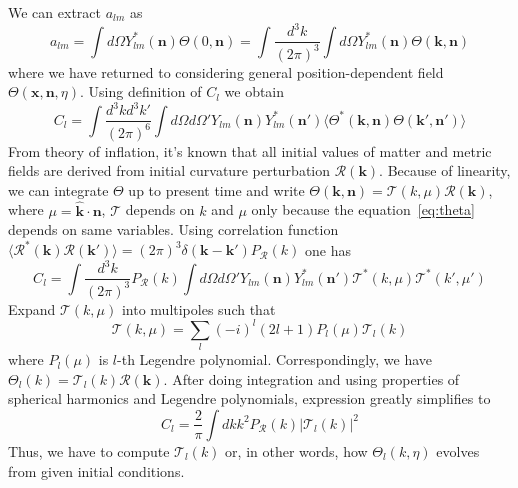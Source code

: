 \documentclass[12pt]{extarticle}
\numberwithin{problem}{section}
\numberwithin{theorem}{section}
\begin{document}
	We can extract $a_{lm}$ as 
	\begin{equation}
		a_{lm} = \int d\Omega Y_{lm}^*(\mathbf{n})\Theta(0, \mathbf{n}) = \int\frac{d^3k}{(2\pi)^3}\int d\Omega Y_{lm}^*(\mathbf{n})\Theta(\mathbf{k},\mathbf{n})
	\end{equation}
	where we have returned to considering general position-dependent field $\Theta(\mathbf{x}, \mathbf{n}, \eta)$. Using definition of $C_l$ we obtain
	\begin{equation}
		C_l = \int\frac{d^3k d^3k'}{(2\pi)^6}\int d\Omega d\Omega' Y_{lm}(\mathbf{n})Y_{lm}^*(\mathbf{n}')\langle\Theta^*(\mathbf{k}, \mathbf{n}) \Theta(\mathbf{k}', \mathbf{n}')\rangle
	\end{equation}
	From theory of inflation, it's known that all initial values of matter and metric fields are derived from initial curvature perturbation $\mathcal{R}(\mathbf{k})$. Because of linearity, we can integrate $\Theta$ up to present time and write $\Theta(\mathbf{k}, \mathbf{n}) = \mathcal{T}(k, \mu)\mathcal{R}(\mathbf{k})$, where $\mu = \mathbf{\hat{k}}\cdot\mathbf{n}$, $\mathcal{T}$ depends on $k$ and $\mu$ only because the equation~\ref{eq:theta} depends on same variables. Using correlation function $\langle\mathcal{R}^*(\mathbf{k})\mathcal{R}(\mathbf{k}')\rangle = (2\pi)^3\delta(\mathbf{k}-\mathbf{k}')P_\mathcal{R}(k)$ one has 
	\begin{equation}
		C_l = \int\frac{d^3k}{(2\pi)^3}P_\mathcal{R}(k)\int d\Omega d\Omega' Y_{lm}(\mathbf{n})Y_{lm}^*(\mathbf{n}')\mathcal{T}^*(k,\mu)\mathcal{T}^*(k',\mu')		
	\end{equation}
	Expand $\mathcal{T}(k, \mu)$ into multipoles such that 
	\begin{equation}
		\label{eq:transfer_l}
		\mathcal{T}(k, \mu) = \sum_l (-i)^l (2l+1) P_l(\mu) \mathcal{T}_l(k)
	\end{equation}
	where $P_l(\mu)$ is $l$-th Legendre polynomial. Correspondingly, we have $\Theta_l(k) = \mathcal{T}_l(k)\mathcal{R}(\mathbf{k})$. After doing integration and using properties of spherical harmonics and Legendre polynomials, expression greatly simplifies to 
	\begin{equation}
		C_l = \frac{2}{\pi}\int dk k^2 P_\mathcal{R}(k) |\mathcal{T}_l(k)|^2
	\end{equation}
	Thus, we have to compute $\mathcal{T}_l(k)$ or, in other words, how $\Theta_l(k, \eta)$ evolves from given initial conditions.
	
\end{document}
